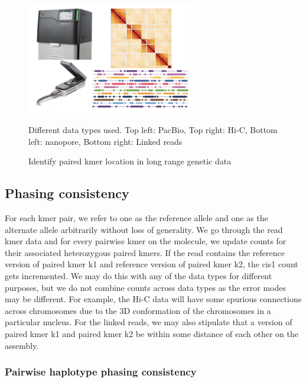 \begin{figure}[htbp!]
\caption{Identify paired kmer location in long range genetic data}
\label{figure:techs}
\begin{centering}
\includegraphics[width=0.65\textwidth]{techs.png}
\par{Different data types used. Top left: PacBio, Top right: Hi-C, Bottom left: nanopore, Bottom right: Linked reads}
\end{centering}
\end{figure}
\subsection{Phasing consistency}
\par{
For each kmer pair, we refer to one as the reference allele and one as the alternate allele arbitrarily without loss of generality. We go through the read kmer data and for every pairwise kmer on the molecule, we update counts for their associated heterozygous paired kmers. If the read contains the reference version of paired kmer k1 and reference version of paired kmer k2, the cis1 count gets incremented. We may do this with any of the data types for different purposes, but we do not combine counts across data types as the error modes may be different. For example, the Hi-C data will have some spurious connections across chromosomes due to the 3D conformation of the chromosomes in a particular nucleus. For the linked reads, we may also stipulate that a version of paired kmer k1 and paired kmer k2 be within some distance of each other on the assembly.
}
\subsubsection{Pairwise haplotype phasing consistency}



